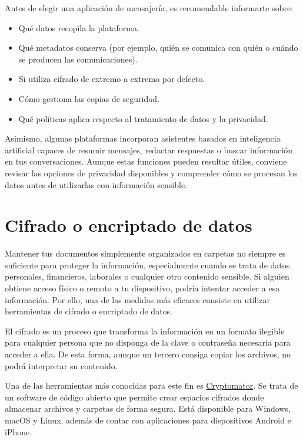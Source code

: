 \documentclass[
  spanish,
  a4paper,
  openany]{book}
\begin{document}
Antes de elegir una aplicación de mensajería, es recomendable informarte sobre:

\begin{itemize}
\item
  Qué datos recopila la plataforma.
\item
  Qué metadatos conserva (por ejemplo, quién se comunica con quién o cuándo se producen las comunicaciones).
\item
  Si utiliza cifrado de extremo a extremo por defecto.
\item
  Cómo gestiona las copias de seguridad.
\item
  Qué políticas aplica respecto al tratamiento de datos y la privacidad.
\end{itemize}

Asimismo, algunas plataformas incorporan asistentes basados en inteligencia artificial capaces de resumir mensajes, redactar respuestas o buscar información en tus conversaciones. Aunque estas funciones pueden resultar útiles, conviene revisar las opciones de privacidad disponibles y comprender cómo se procesan los datos antes de utilizarlas con información sensible.

\section{Cifrado o encriptado de datos}\label{cifrado-o-encriptado-de-datos}

Mantener tus documentos simplemente organizados en carpetas no siempre es suficiente para proteger la información, especialmente cuando se trata de datos personales, financieros, laborales o cualquier otro contenido sensible. Si alguien obtiene acceso físico o remoto a tu dispositivo, podría intentar acceder a esa información. Por ello, una de las medidas más eficaces consiste en utilizar herramientas de cifrado o encriptado de datos.

El cifrado es un proceso que transforma la información en un formato ilegible para cualquier persona que no disponga de la clave o contraseña necesaria para acceder a ella. De esta forma, aunque un tercero consiga copiar los archivos, no podrá interpretar su contenido.

Una de las herramientas más conocidas para este fin es \href{https://cryptomator.org/}{Cryptomator}. Se trata de un software de código abierto que permite crear espacios cifrados donde almacenar archivos y carpetas de forma segura. Está disponible para Windows, macOS y Linux, además de contar con aplicaciones para dispositivos Android e iPhone.
\end{document}
